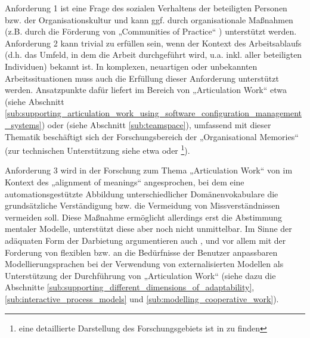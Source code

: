 Anforderung 1 ist eine Frage des sozialen Verhaltens der beteiligten Personen bzw. der Organisationskultur und kann ggf. durch organisationale Maßnahmen (z.B. durch die Förderung von „Communities of Practice“ \citep{Wenger99}) unterstützt werden. Anforderung 2 kann trivial zu erfüllen sein, wenn der Kontext des Arbeitsablaufs (d.h. das Umfeld, in dem die Arbeit durchgeführt wird, u.a. inkl. aller beteiligten Individuen) bekannt ist. In komplexen, neuartigen oder unbekannten Arbeitssituationen muss auch die Erfüllung dieser Anforderung unterstützt werden. Ansatzpunkte dafür liefert im Bereich von „Articulation Work“ etwa \citet{Grinter96} (siehe Abschnitt \ref{sub:supporting_articulation_work_using_software_configuration_management_systems}) oder \citet{Fuchs01} (siehe Abschnitt \ref{sub:teamspace}), umfassend mit dieser Thematik beschäftigt sich der Forschungsbereich der „Organisational Memories“ (zur technischen Unterstützung siehe etwa \citep{Abecker98} oder \citep{Diefenbruch02}\footnote{eine detaillierte Darstellung des Forschungsgebiets ist in \citep{Maier08} zu finden}).

Anforderung 3 wird in der Forschung zum Thema „Articulation Work“ von \citet{Sarini02} im Kontext des „alignment of meanings“ angesprochen, bei dem eine automationsgestützte Abbildung unterschiedlicher Domänenvokabulare die grundsätzliche Verständigung bzw. die Vermeidung von Missverständnissen vermeiden soll. Diese Maßnahme ermöglicht allerdings erst die Abstimmung mentaler Modelle, unterstützt diese aber noch nicht unmittelbar. Im Sinne der adäquaten Form der Darbietung argumentieren auch \citet{Divitini00}, \citep{Jorgensen04} und vor allem \citet{Herrmann02} mit der Forderung von flexiblen bzw. an die Bedürfnisse der Benutzer anpassbaren Modellierungsprachen bei der Verwendung von externalisierten Modellen als Unterstützung der Durchführung von „Articulation Work“ (siehe dazu die Abschnitte \ref{sub:supporting_different_dimensions_of_adaptability}, \ref{sub:interactive_process_models} und \ref{sub:modelling_cooperative_work}).

